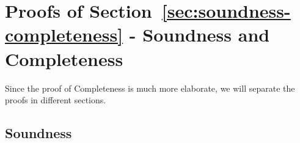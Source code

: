 
\section{Proofs of Section~\ref{sec:soundness-completeness} - Soundness and Completeness}\label{app:soundness-completeness}

\soundcomplete*

Since the proof of Completeness is much more elaborate, we will separate the proofs in different sections.

\subsection{Soundness}\label{ssec:soundness}

